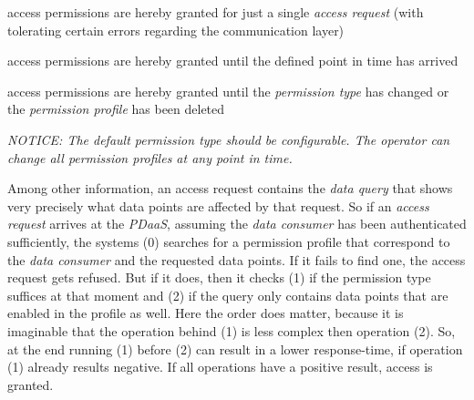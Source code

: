 \documentclass[12pt,english,a4paper,titlepage,cleardoublepage=empty,dottedtoc]{report}
\providecommand{\tightlist}{%
  \setlength{\itemsep}{0pt}\setlength{\parskip}{0pt}}
\begin{document}
\begin{description}
\tightlist
\item[\emph{one-time-only}]
access permissions are hereby granted for just a single \emph{access
request} (with tolerating certain errors regarding the communication
layer)
\item[\emph{expires-on-date}]
access permissions are hereby granted until the defined point in time
has arrived
\item[\emph{until-further-notice}]
access permissions are hereby granted until the \emph{permission type}
has changed or the \emph{permission profile} has been deleted
\end{description}

\emph{NOTICE: The default permission type should be configurable. The
operator can change all permission profiles at any point in time.}

Among other information, an access request contains the \emph{data
query} that shows very precisely what data points are affected by that
request. So if an \emph{access request} arrives at the \emph{PDaaS},
assuming the \emph{data consumer} has been authenticated sufficiently,
the systems (0) searches for a permission profile that correspond to the
\emph{data consumer} and the requested data points. If it fails to find
one, the access request gets refused. But if it does, then it checks (1)
if the permission type suffices at that moment and (2) if the query only
contains data points that are enabled in the profile as well. Here the
order does matter, because it is imaginable that the operation behind
(1) is less complex then operation (2). So, at the end running (1)
before (2) can result in a lower response-time, if operation (1) already
results negative. If all operations have a positive result, access is
granted.
\end{document}
